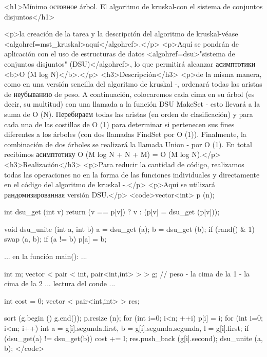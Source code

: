 <h1>Mínimo остовное árbol. El algoritmo de kruskal-con el sistema de conjuntos disjuntos</h1>

<p>la creación de la tarea y la descripción del algoritmo de kruskal-véase <algohref=mst_kruskal>aquí</algohref>.</p>
<p>Aquí se pondrán de aplicación con el uso de estructuras de datos <algohref=dsu>"sistema de conjuntos disjuntos" (DSU)</algohref>, lo que permitirá alcanzar асимптотики <b>O (M log N)</b>.</p>
<h3>Descripción</h3>
<p>de la misma manera, como en una versión sencilla del algoritmo de kruskal -, ordenará todas las aristas de неубыванию de peso. A continuación, colocaremos cada cima en su árbol (es decir, su multitud) con una llamada a la función DSU MakeSet - esto llevará a la suma de O (N). Перебираем todas las aristas (en orden de clasificación) y para cada una de las costillas de O (1) para determinar si pertenecen sus fines diferentes a los árboles (con dos llamadas FindSet por O (1)). Finalmente, la combinación de dos árboles se realizará la llamada Union - por O (1). En total recibimos асимптотику O (M log N + N + M) = O (M log N).</p>
<h3>Realización</h3>
<p>Para reducir la cantidad de código, realizamos todas las operaciones no en la forma de las funciones individuales y directamente en el código del algoritmo de kruskal -.</p>
<p>Aquí se utilizará рандомизированная versión DSU.</p>
<code>vector<int> p (n);

int dsu_get (int v) {
return (v == p[v]) ? v : (p[v] = dsu_get (p[v]));
}

void dsu_unite (int a, int b) {
a = dsu_get (a);
b = dsu_get (b);
if (rand() & 1)
swap (a, b);
if (a != b)
p[a] = b;
}

... en la función main(): ...

int m;
vector < pair < int, pair<int,int> > > g; // peso - la cima de la 1 - la cima de la 2
... lectura del conde ...

int cost = 0;
vector < pair<int,int> > res;

sort (g.begin () g.end());
p.resize (n);
for (int i=0; i<n; ++i)
p[i] = i;
for (int i=0; i<m; i++) {
int a = g[i].segunda.first, b = g[i].segunda.segunda, l = g[i].first;
if (dsu_get(a) != dsu_get(b)) {
cost += l;
res.push_back (g[i].second);
dsu_unite (a, b);
}
}</code>